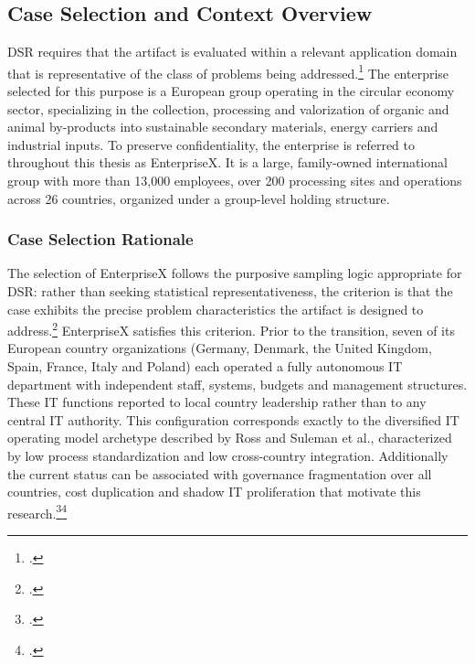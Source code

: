 \subsection{Case Selection and Context Overview}
\label{subsec:CaseSelectionAndContextOverview}
\ac{DSR} requires that the artifact is evaluated within a relevant application domain that is representative of the class of problems being addressed.\footcite[85]{hevnerDesignScienceInformation2004}
The enterprise selected for this purpose is a European group operating in the circular economy sector, specializing in the collection, processing and valorization of organic and animal by-products into sustainable secondary materials, energy carriers and industrial inputs.
To preserve confidentiality, the enterprise is referred to throughout this thesis as \glqq{}EnterpriseX\grqq{}.
It is a large, family-owned international group with more than 13,000 employees, over 200 processing sites and operations across 26 countries, organized under a group-level holding structure.
\subsubsection{Case Selection Rationale}
\label{subsubsec:CaseSelectionRationale}
The selection of EnterpriseX follows the purposive sampling logic appropriate for \ac{DSR}: rather than seeking statistical representativeness, the criterion is that the case exhibits the precise problem characteristics the artifact is designed to address.\footcite[54]{peffersDesignScienceResearch2007}
EnterpriseX satisfies this criterion.
Prior to the transition, seven of its European country organizations (Germany, Denmark, the United Kingdom, Spain, France, Italy and Poland) each operated a fully autonomous IT department with independent staff, systems, budgets and management structures.
These IT functions reported to local country leadership rather than to any central IT authority.
This configuration corresponds exactly to the diversified IT operating model archetype described by Ross and Suleman et al., characterized by low process standardization and low cross-country integration.
Additionally the current status can be associated with governance fragmentation over all countries, cost duplication and shadow IT proliferation that motivate this research.\footcite[3-4]{rossForgetStrategyFocus2005}\footcite[5-6]{sulemanITOperatingModels2025}


